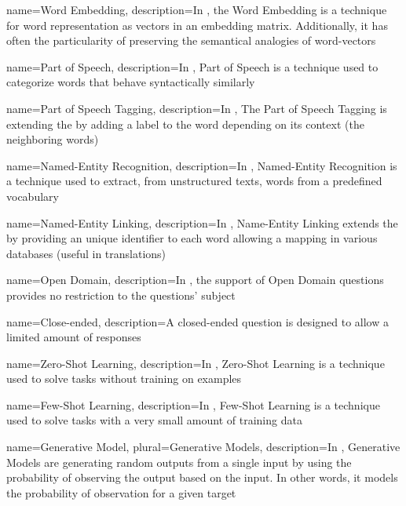 {
  name={Word Embedding},
  description={In , the Word Embedding is a technique for word representation as vectors in an embedding matrix. Additionally, it has often the particularity of preserving the semantical analogies of word-vectors}
}

{
  name={Part of Speech},
  description={In , Part of Speech is a technique used to categorize words that behave syntactically similarly}
}

{
  name={Part of Speech Tagging},
  description={In , The Part of Speech Tagging is extending the  by adding a label to the word depending on its context (the neighboring words)}
}


{
  name={Named-Entity Recognition},
  description={In , Named-Entity Recognition is a technique used to extract, from unstructured texts, words from a predefined vocabulary}
}

{
  name={Named-Entity Linking},
  description={In , Name-Entity Linking extends the  by providing an unique identifier to each word allowing a mapping in various databases (useful in translations)}
}

{
  name={Open Domain},
  description={In , the support of Open Domain questions provides no restriction to the questions' subject}
}

{
  name={Close-ended},
  description={A closed-ended question is designed to allow a limited amount of responses}
}

{
  name={Zero-Shot Learning},
  description={In , Zero-Shot Learning is a technique used to solve tasks without training on examples}
}

{
  name={Few-Shot Learning},
  description={In , Few-Shot Learning is a technique used to solve tasks with a very small amount of training data}
}

{
  name={Generative Model},
  plural={Generative Models},
  description={In , Generative Models are generating random outputs from a single input by using the probability of observing the output based on the input. In other words, it models the probability of observation for a given target}
}

